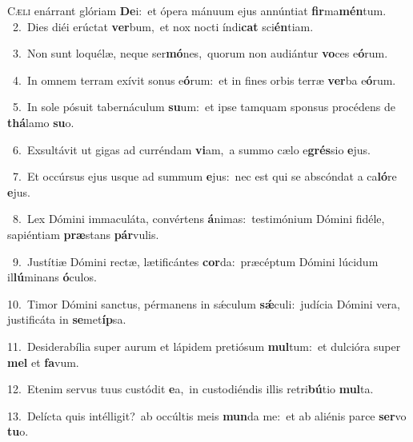 \lettrine{\initial\textcolor{\initialcolor}{C}}{æli} enárrant glóriam \textbf{De}\-i:~\star et ópera mánuum ejus annúntiat \textbf{fir}\-ma\-\textbf{mén}\-tum.\\
{\numbfont\textcolor{\numbcolor}{~2.}}~Dies diéi erúctat \textbf{ver}\-bum,~\star et nox nocti índi\textbf{cat} sci\-\textbf{én}\-tiam.\par
{\numbfont\textcolor{\numbcolor}{~3.}}~Non sunt loquélæ, neque ser\-\textbf{mó}\-nes,~\star quorum non audiántur \textbf{vo}\-ces e\-\textbf{ó}\-rum.\par
{\numbfont\textcolor{\numbcolor}{~4.}}~In omnem terram exívit sonus e\-\textbf{ó}\-rum:~\star et in fines orbis terræ \textbf{ver}\-ba e\-\textbf{ó}\-rum.\par
{\numbfont\textcolor{\numbcolor}{~5.}}~In sole pósuit tabernáculum \textbf{su}\-um:~\star et ipse tamquam sponsus procédens de \textbf{thá}\-lamo \textbf{su}\-o.\par
{\numbfont\textcolor{\numbcolor}{~6.}}~Exsultávit ut gigas ad curréndam \textbf{vi}\-am,~\star a summo cælo e\-\textbf{grés}\-sio \textbf{e}\-jus.\par
{\numbfont\textcolor{\numbcolor}{~7.}}~Et occúrsus ejus usque ad summum \textbf{e}\-jus:~\star nec est qui se abscóndat a ca\-\textbf{ló}\-re \textbf{e}\-jus.\par
{\numbfont\textcolor{\numbcolor}{~8.}}~Lex Dómini immaculáta, convértens \textbf{á}\-nimas:~\star testimónium Dómini fidéle, sapiéntiam \textbf{præ}\-stans \textbf{pár}\-vulis.\par
{\numbfont\textcolor{\numbcolor}{~9.}}~Justítiæ Dómini rectæ, lætificántes \textbf{cor}\-da:~\star præcéptum Dómini lúcidum il\-\textbf{lú}\-minans \textbf{ó}\-culos.\par
{\numbfont\textcolor{\numbcolor}{10.}}~Timor Dómini sanctus, pérmanens in sǽculum \textbf{sǽ}\-culi:~\star judícia Dómini vera, justificáta in \textbf{se}\-met\-\textbf{íp}\-sa.\par
{\numbfont\textcolor{\numbcolor}{11.}}~Desiderabília super aurum et lápidem pretiósum \textbf{mul}\-tum:~\star et dulcióra super \textbf{mel} et \textbf{fa}\-vum.\par
{\numbfont\textcolor{\numbcolor}{12.}}~Etenim servus tuus custódit \textbf{e}\-a,~\star in custodiéndis illis retri\-\textbf{bú}\-tio \textbf{mul}\-ta.\par
{\numbfont\textcolor{\numbcolor}{13.}}~Delícta quis intélligit?~\dagger ab occúltis meis \textbf{mun}\-da me:~\star et ab aliénis parce \textbf{ser}\-vo \textbf{tu}\-o.\par
